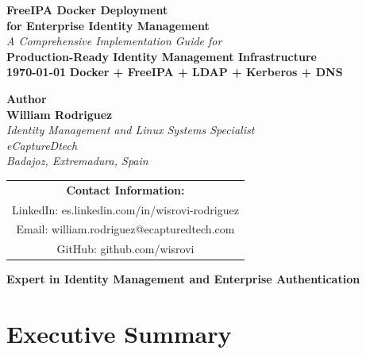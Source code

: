 \documentclass[12pt,a4paper]{report}
\begin{document}
\begin{titlepage}
    \centering
    \vspace*{2cm}
    \vspace{1cm}
    {\color{blue!70!black}\Huge\textbf{FreeIPA Docker Deployment}}\\[0.5cm]
    {\color{orange!80!black}\Large\textbf{for Enterprise Identity Management}}\\[1cm]
    {\large\textit{A Comprehensive Implementation Guide for}}\\[0.3cm]
    {\Large\textbf{Production-Ready Identity Management Infrastructure}}\\[1.5cm]
    {\large\textbf{\today}}
    \vfill
    \colorbox{blue!70!black}{
        \color{white}\textbf{Docker + FreeIPA + LDAP + Kerberos + DNS}
    }
\end{titlepage}

\begin{titlepage}
    \centering
    \vspace*{3cm}
    {\color{blue!70!black}\Large\textbf{Author}}\\[1cm]
    {\Large\textbf{William Rodriguez}}\\[0.5cm]
    \textit{Identity Management and Linux Systems Specialist}\\[0.3cm]
    \textit{eCaptureDtech}\\[0.2cm]
    \textit{Badajoz, Extremadura, Spain}\\[1cm]
    \begin{tabular}{c}
        \textbf{Contact Information:}\\[0.5cm]
        LinkedIn: es.linkedin.com/in/wisrovi-rodriguez\\[0.2cm]
        Email: william.rodriguez@ecapturedtech.com\\[0.2cm]
        GitHub: github.com/wisrovi
    \end{tabular}
    \vfill
    \colorbox{orange!80!black}{
        \color{white}\textbf{Expert in Identity Management and Enterprise Authentication}
    }
\end{titlepage}

\tableofcontents
\cleardoublepage

\listoffigures
\cleardoublepage
\listoftables
\cleardoublepage
\lstlistoflistings
\cleardoublepage

\chapter{Executive Summary}
\end{document}
